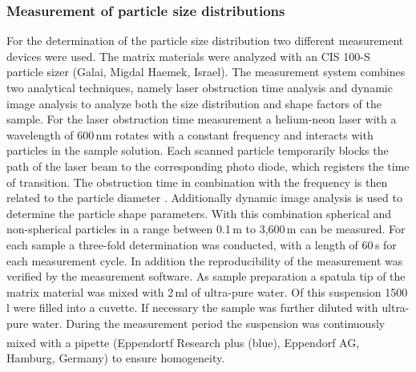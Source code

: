 \subsubsection{Measurement of particle size distributions}
\label{subsubsec:part_dist_meas}
For the determination of the particle size distribution two different measurement devices were used. The matrix materials were analyzed with an CIS 100-S particle sizer (Galai, Migdal Haemek, Israel). The measurement system combines two analytical techniques, namely laser obstruction time analysis and dynamic image analysis to analyze both the size distribution and shape factors of the sample. For the laser obstruction time measurement a helium-neon laser with a wavelength of 600\,nm rotates with a constant frequency and interacts with particles in the sample solution. Each scanned particle temporarily blocks the path of the laser beam to the corresponding photo diode, which registers the time of transition. The obstruction time in combination with the frequency is then related to the particle diameter \cite{neis1997particle}. Additionally dynamic image analysis is used to determine the particle shape parameters. With this combination spherical and non-spherical particles in a range between 0.1\,\textmu m to 3,600\,\textmu m can be measured. For each sample a three-fold determination was conducted, with a length of 60\,s for each measurement cycle. In addition the reproducibility of the measurement was verified by the measurement software. As sample preparation a spatula tip of the matrix material was mixed with 2\,ml of ultra-pure water. Of this suspension 1500\,\textmu l were filled into a cuvette. If necessary the sample was further diluted with ultra-pure water. During the measurement period the suspension was continuously mixed with a pipette (Eppendortf Research \textsuperscript{\textregistered} plus (blue), Eppendorf AG, Hamburg, Germany) to ensure homogeneity. \\
\\
